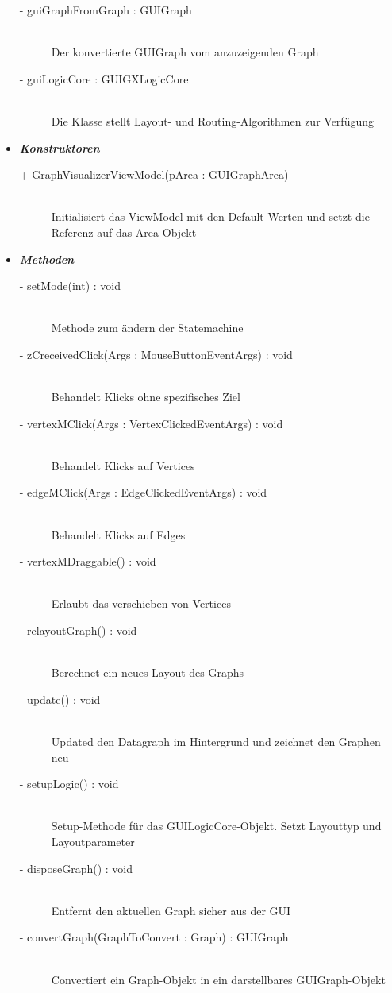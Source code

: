 \documentclass[13pt]{scrreprt}
\begin{document}
\begin{itemize}[label = {$\circ$}]
\begin{description}
			\item [- guiGraphFromGraph : GUIGraph] \hfill \\ Der konvertierte GUIGraph vom anzuzeigenden Graph
			\item [- guiLogicCore : GUIGXLogicCore] \hfill \\ Die Klasse stellt Layout- und Routing-Algorithmen zur Verfügung
		\end{description}
		\item {\large \textbf{\textit{Konstruktoren}}\par}
		\begin{description}
			\item [+ GraphVisualizerViewModel(pArea : GUIGraphArea)] \hfill \\ Initialisiert das ViewModel mit den Default-Werten und setzt die Referenz auf das Area-Objekt
		\end{description}
		\item {\large \textbf{\textit{Methoden}}\par}
		\begin{description}
			\item [- setMode(int) : void] \hfill \\ Methode zum ändern der Statemachine
			\item [- zCreceivedClick(Args : MouseButtonEventArgs) : void] \hfill \\ Behandelt Klicks ohne spezifisches Ziel
			\item [- vertexMClick(Args : VertexClickedEventArgs) : void] \hfill \\ Behandelt Klicks auf Vertices
			\item [- edgeMClick(Args : EdgeClickedEventArgs) : void] \hfill \\ Behandelt Klicks auf Edges
			\item [- vertexMDraggable() : void] \hfill \\ Erlaubt das verschieben von Vertices
			\item [- relayoutGraph() : void] \hfill \\ Berechnet ein neues Layout des Graphs
			\item [- update() : void] \hfill \\ Updated den Datagraph im Hintergrund und zeichnet den Graphen neu
			\item [- setupLogic() : void] \hfill \\ Setup-Methode für das GUILogicCore-Objekt. Setzt Layouttyp und Layoutparameter
			\item [- disposeGraph() : void] \hfill \\ Entfernt den aktuellen Graph sicher aus der GUI
			\item [- convertGraph(GraphToConvert : Graph) : GUIGraph] \hfill \\ Convertiert ein Graph-Objekt in ein darstellbares GUIGraph-Objekt
		\end{description}
	\end{itemize}
	\newpage
\end{document}
